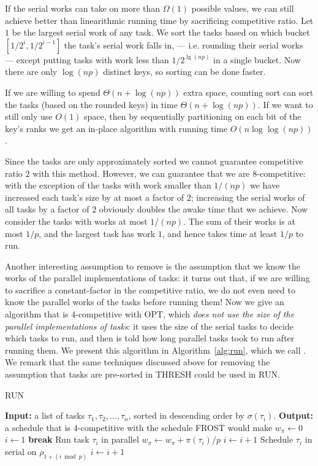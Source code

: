 If the serial works can take on more than $\Omega(1)$ possible
values, we can still achieve better than linearithmic running
time by sacrificing competitive ratio. Let $1$ be the largest
serial work of any task. We sort the tasks based on which bucket
$[1/2^i, 1/2^{i-1}]$ the task's serial work falls in, --- i.e.
rounding their serial works ---  except putting tasks with work
less than $1/2^{\lg (np)}$ in a single bucket. Now there are only
$\log (np)$ distinct keys, so sorting can be done faster. 

If we are willing to spend $\Theta(n + \log (np))$
extra space, counting sort can sort the tasks (based on the
rounded keys) in time $\Theta(n+\log(np))$. 
If we want to still only use $O(1)$ space, then by
sequentially partitioning on each bit of the key's ranks we get
an in-place algorithm with running time $O(n \log \log (np))$.

Since the tasks are only approximately sorted we cannot
guarantee competitive ratio $2$ with this method. However, we can
guarantee that we are $8$-competitive: with the exception of the
tasks with work smaller than $1/(np)$ we have increased each
task's size by at most a factor of $2$; increasing the serial
works of all tasks by a factor of $2$ obviously doubles the awake
time that we achieve. Now consider the tasks with works at most
$1/(np)$. The sum of their works is at most $1/p$, and the
largest task has work $1$, and hence takes time at least $1/p$ to
run.

Another interesting assumption to remove is the assumption that
we know the works of the parallel implementations of tasks: it
turns out that, if we are willing to sacrifice a constant-factor
in the competitive ratio, we do not even need to know the
parallel works of the tasks before running them! Now we give an
algorithm that is $4$-competitive with OPT, which \emph{does not
use the size of the parallel implementations of tasks}: it uses
the size of the serial tasks to decide which tasks to run, and
then is told how long parallel tasks took to run after running
them. We present this algorithm in Algorithm~\ref{alg:run}, which
we call . We remark that the same techniques discussed
above for removing the assumption that tasks are pre-sorted in
THRESH could be used in RUN.

\begin{algorithm}
  \caption{RUN}
  \label{alg:run}
  \begin{algorithmic}
    \State \textbf{Input: } a list of tasks $\tau_1, \tau_2,
    \ldots, \tau_n$, sorted in descending order by
    $\sigma(\tau_i).$
    \State \textbf{Output: } a schedule that is $4$-competitive
    with the schedule FROST would make
    \State 
    \State $w_\pi \gets 0$
    \State $i \gets 1$
        \State \textbf{break}
      \EndIf
      \State Run task $\tau_i$ in parallel
      \State $w_\pi \gets w_\pi + \pi(\tau_i)/p$
      \State $i \gets i+1$
    \EndWhile
      \State Schedule $\tau_i$ in serial on $\rho_{1+(i \bmod p)}$
      \State $i \gets i+1$
    \EndWhile
  \end{algorithmic}
\end{algorithm}

